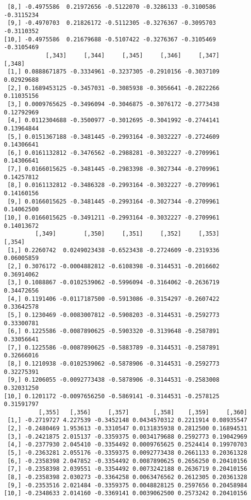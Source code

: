 \documentclass[
  letterpaper,
  DIV=11,
  numbers=noendperiod]{scrreprt}
\begin{document}
\begin{verbatim}
 [8,] -0.4975586  0.21972656 -0.5122070 -0.3286133 -0.3100586 -0.3115234
 [9,] -0.4970703  0.21826172 -0.5112305 -0.3276367 -0.3095703 -0.3110352
[10,] -0.4975586  0.21679688 -0.5107422 -0.3276367 -0.3105469 -0.3105469
            [,343]     [,344]     [,345]     [,346]     [,347]     [,348]
 [1,] 0.0888671875 -0.3334961 -0.3237305 -0.2910156 -0.3037109 0.02929688
 [2,] 0.1689453125 -0.3457031 -0.3085938 -0.3056641 -0.2822266 0.11035156
 [3,] 0.0009765625 -0.3496094 -0.3046875 -0.3076172 -0.2773438 0.12792969
 [4,] 0.0112304688 -0.3500977 -0.3012695 -0.3041992 -0.2744141 0.13964844
 [5,] 0.0151367188 -0.3481445 -0.2993164 -0.3032227 -0.2724609 0.14306641
 [6,] 0.0161132812 -0.3476562 -0.2988281 -0.3032227 -0.2709961 0.14306641
 [7,] 0.0166015625 -0.3481445 -0.2983398 -0.3027344 -0.2709961 0.14257812
 [8,] 0.0161132812 -0.3486328 -0.2993164 -0.3032227 -0.2709961 0.14160156
 [9,] 0.0166015625 -0.3481445 -0.2993164 -0.3027344 -0.2709961 0.14062500
[10,] 0.0166015625 -0.3491211 -0.2993164 -0.3032227 -0.2709961 0.14013672
         [,349]        [,350]     [,351]     [,352]     [,353]     [,354]
 [1,] 0.2260742  0.0249023438 -0.6523438 -0.2724609 -0.2319336 0.06005859
 [2,] 0.3076172 -0.0004882812 -0.6108398 -0.3144531 -0.2016602 0.36914062
 [3,] 0.1088867 -0.0102539062 -0.5996094 -0.3164062 -0.2636719 0.34472656
 [4,] 0.1191406 -0.0117187500 -0.5913086 -0.3154297 -0.2607422 0.33642578
 [5,] 0.1230469 -0.0083007812 -0.5908203 -0.3144531 -0.2592773 0.33300781
 [6,] 0.1225586 -0.0087890625 -0.5903320 -0.3139648 -0.2587891 0.33056641
 [7,] 0.1225586 -0.0087890625 -0.5883789 -0.3144531 -0.2587891 0.32666016
 [8,] 0.1210938 -0.0102539062 -0.5878906 -0.3144531 -0.2592773 0.32275391
 [9,] 0.1206055 -0.0092773438 -0.5878906 -0.3144531 -0.2583008 0.32031250
[10,] 0.1201172 -0.0097656250 -0.5869141 -0.3144531 -0.2578125 0.31591797
          [,355]   [,356]     [,357]       [,358]    [,359]     [,360]
 [1,] -0.2719727 4.227539 -0.3452148 0.0434570312 0.2211914 0.08935547
 [2,] -0.2480469 1.953613 -0.3310547 0.0131835938 0.2812500 0.16894531
 [3,] -0.2421875 2.015137 -0.3359375 0.0034179688 0.2592773 0.19042969
 [4,] -0.2377930 2.045410 -0.3354492 0.0009765625 0.2524414 0.19970703
 [5,] -0.2363281 2.055176 -0.3359375 0.0092773438 0.2661133 0.20361328
 [6,] -0.2358398 2.047852 -0.3354492 0.0087890625 0.2656250 0.20410156
 [7,] -0.2358398 2.039551 -0.3354492 0.0073242188 0.2636719 0.20410156
 [8,] -0.2358398 2.030273 -0.3364258 0.0063476562 0.2612305 0.20361328
 [9,] -0.2353516 2.021484 -0.3359375 0.0048828125 0.2597656 0.20458984
[10,] -0.2348633 2.014160 -0.3369141 0.0039062500 0.2573242 0.20410156

\end{verbatim}
\end{document}
